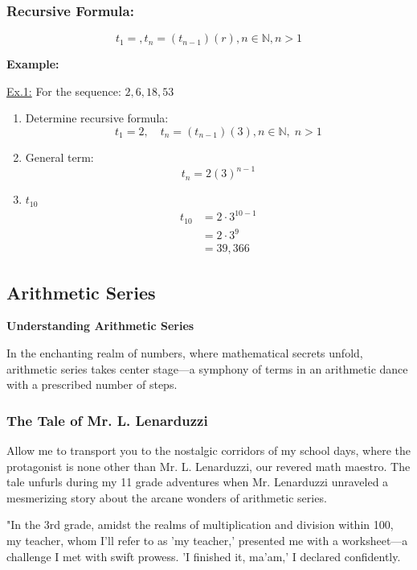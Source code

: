 \documentclass[12pt,a4paper]{article}
\newenvironment{example}
  {\begin{framed}\colorbox{examplecolor}{
  \parbox{\dimexpr\linewidth-2\fboxsep}{
  \textbf{Example:}}}}
  {\end{framed}}
\begin{document}
\subsubsection*{Recursive Formula:}
\begin{equation*}
    t_1=,t_n=(t_{n-1})(r), n \in \mathbb{N}, n>1
\end{equation*}
\begin{example}
    \underline{Ex.1:} For the sequence: $2, 6, 18, 53$
    \begin{enumerate}[label=(\alph*), align=left, left=0pt, labelwidth=1.5em, labelsep=1em]
        \item Determine recursive formula: 
        \[
        t_1 = 2, \quad t_n = (t_{n-1}) (3), n \in \mathbb{N}, \; n > 1
        \]
        \item General term: 
        \[
        t_n = 2 (3)^{n-1}
        \]
        \item $t_{10}$
        \begin{align*}
            t_{10} &= 2 \cdot 3^{10-1} \\
                   &= 2 \cdot 3^9 \\
                   &= 39,366
        \end{align*}
    \end{enumerate}
\end{example}
\subsection{Arithmetic Series}
\textbf{Understanding Arithmetic Series}

In the enchanting realm of numbers, where mathematical secrets unfold, arithmetic series takes center stage—a symphony of terms in an arithmetic dance with a prescribed number of steps.

\subsubsection*{The Tale of Mr. L. Lenarduzzi}

Allow me to transport you to the nostalgic corridors of my school days, where the protagonist is none other than Mr. L. Lenarduzzi, our revered math maestro. The tale unfurls during my 11 grade adventures when Mr. Lenarduzzi unraveled a mesmerizing story about the arcane wonders of arithmetic series.

"In the 3rd grade, amidst the realms of multiplication and division within 100, my teacher, whom I'll refer to as 'my teacher,' presented me with a worksheet—a challenge I met with swift prowess. 'I finished it, ma'am,' I declared confidently.
\end{document}
